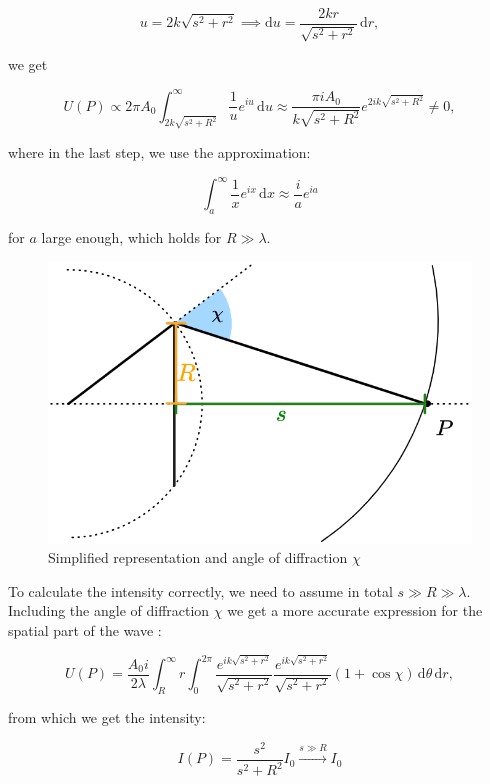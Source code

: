 \documentclass[11pt,a4paper]{article}
\begin{document}
\[u = 2k\sqrt{s^{2} + r^{2}} \implies \mathrm{d}u = \frac{2kr}{\sqrt{s^{2} + r^{2}}} \, \mathrm{d}r,\]

we get

\[U(P) \propto 2\pi A_{0} \int_{2k\sqrt{s^{2} + R^{2}}}^{\infty} \frac{1}{u} e^{iu} \, \mathrm{d}u \approx \frac{\pi iA_{0}}{k\sqrt{s^{2} + R^{2}}} e^{2ik\sqrt{s^{2} + R^{2}}} \neq 0,\]

where in the last step, we use the approximation:

\[\int_{a}^{\infty} \frac{1}{x} e^{ix} \, \mathrm{d}x \approx \frac{i}{a} e^{ia}\]

for \(a\) large enough, which holds for \(R \gg \lambda\).

\begin{figure}
    \includegraphics[width=1\linewidth]{images/diffraction-angle.png}
    \caption{Simplified representation and angle of diffraction $\chi$}
\end{figure}

To calculate the intensity correctly, we need to assume in total \(s \gg R \gg \lambda\).
Including the angle of diffraction \(\chi\) we get a more accurate expression for the spatial part of the wave \cite{KTHReport}:

\[U(P) = \frac{A_{0}i}{2\lambda} \int_{R}^{\infty} r \int_{0}^{2\pi} \frac{e^{ik\sqrt{s^{2} + r^{2}}}}{\sqrt{s^{2} + r^{2}}} \frac{e^{ik\sqrt{s^{2} + r^{2}}}}{\sqrt{s^{2} + r^{2}}} (1 + \cos \chi) \, \mathrm{d}\theta \, \mathrm{d}r,\]

from which we get the intensity:

\[I(P) = \frac{s^{2}}{s^{2} + R^{2}} I_{0} \xrightarrow{s \gg R} I_{0}\]
\\\vspace{0.5cm}
\end{document}
